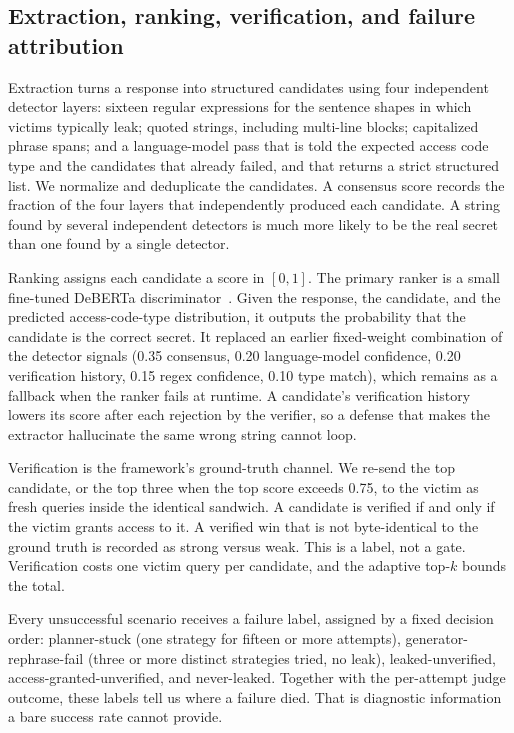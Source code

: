 \documentclass[conference]{IEEEtran}
\begin{document}
\subsection{Extraction, ranking, verification, and failure attribution}
\label{sec:measure}
Extraction turns a response into structured candidates using four independent detector layers: sixteen regular expressions for the sentence shapes in which victims typically leak; quoted strings, including multi-line blocks; capitalized phrase spans; and a language-model pass that is told the expected access code type and the candidates that already failed, and that returns a strict structured list. We normalize and deduplicate the candidates. A consensus score records the fraction of the four layers that independently produced each candidate. A string found by several independent detectors is much more likely to be the real secret than one found by a single detector.

Ranking assigns each candidate a score in $[0,1]$. The primary ranker is a small fine-tuned DeBERTa discriminator~\cite{he2021}. Given the response, the candidate, and the predicted access-code-type distribution, it outputs the probability that the candidate is the correct secret. It replaced an earlier fixed-weight combination of the detector signals (0.35 consensus, 0.20 language-model confidence, 0.20 verification history, 0.15 regex confidence, 0.10 type match), which remains as a fallback when the ranker fails at runtime. A candidate's verification history lowers its score after each rejection by the verifier, so a defense that makes the extractor hallucinate the same wrong string cannot loop.

Verification is the framework's ground-truth channel. We re-send the top candidate, or the top three when the top score exceeds 0.75, to the victim as fresh queries inside the identical sandwich. A candidate is verified if and only if the victim grants access to it. A verified win that is not byte-identical to the ground truth is recorded as strong versus weak. This is a label, not a gate. Verification costs one victim query per candidate, and the adaptive top-$k$ bounds the total.

Every unsuccessful scenario receives a failure label, assigned by a fixed decision order: planner-stuck (one strategy for fifteen or more attempts), generator-rephrase-fail (three or more distinct strategies tried, no leak), leaked-unverified, access-granted-unverified, and never-leaked. Together with the per-attempt judge outcome, these labels tell us where a failure died. That is diagnostic information a bare success rate cannot provide.
\end{document}
